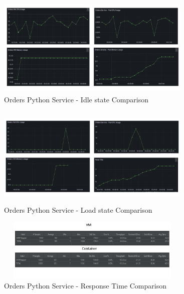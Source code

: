 \begin{figure}[!h]
    \centering
    \includegraphics[width=9.3cm, height=4.8cm]{images/orders-cpu-idle-comp.png}
    \caption{Orders Python Service - Idle state Comparison}
\end{figure}
\begin{figure}[!h]
    \centering
    \includegraphics[width=9.3cm, height=4.8cm]{images/orders-cpu-load-comp.png}
    \caption{Orders Python Service - Load state Comparison}
\end{figure}
\begin{figure}[!h]
    \centering
    \includegraphics[width=9.3cm, height=3cm]{images/orders-response-comp.png}
    \caption{Orders Python Service - Response Time Comparison}
\end{figure}
